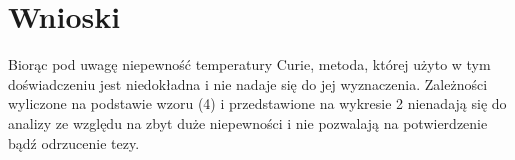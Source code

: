 \documentclass[a4paper,10pt]{article}
\begin{document}
\section{Wnioski}
Biorąc pod uwagę niepewność temperatury Curie, metoda, której użyto w tym doświadczeniu jest niedokładna i  nie nadaje się do jej wyznaczenia.
Zależności wyliczone na podstawie wzoru (4) i przedstawione na wykresie 2 nienadają się do analizy ze względu na zbyt duże niepewności i nie pozwalają na potwierdzenie bądź odrzucenie tezy. 
\end{document}
